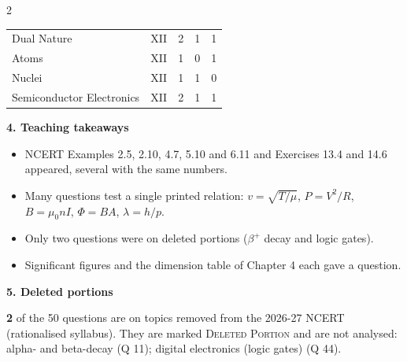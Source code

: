 \begin{multicols}{2}
{\begin{tabular}{@{}p{4.7cm}c@{\,}r@{\,}r@{\,}r@{}}
Dual Nature & XII & 2 & 1 & 1\\
Atoms & XII & 1 & 0 & 1\\
Nuclei & XII & 1 & 1 & 0\\
Semiconductor Electronics & XII & 2 & 1 & 1\\
\bottomrule\end{tabular}}\par\medskip
\textbf{\color{crimson}4. Teaching takeaways}\par\smallskip
{\footnotesize\begin{itemize}[leftmargin=1em,nosep]
\item NCERT Examples 2.5, 2.10, 4.7, 5.10 and 6.11 and Exercises 13.4 and 14.6 appeared, several with the same numbers.
\item Many questions test a single printed relation: $v=\sqrt{T/\mu}$, $P=V^2/R$, $B=\mu_0 nI$, $\Phi=BA$, $\lambda=h/p$.
\item Only two questions were on deleted portions ($\beta^+$ decay and logic gates).
\item Significant figures and the dimension table of Chapter 4 each gave a question.
\end{itemize}}\par\medskip
\textbf{\color{crimson}5. Deleted portions}\par\smallskip
\textbf{2} of the 50 questions are on topics removed from the 2026-27 NCERT (rationalised syllabus). They are marked \textsc{Deleted Portion} and are not analysed: alpha- and beta-decay (Q 11); digital electronics (logic gates) (Q 44).\par
\end{multicols}


